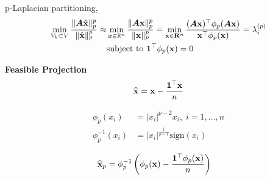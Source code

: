 \documentclass[12pt]{article}
\begin{document}
{{\begin{multicols}{2}
{\begin{minipage}{.58\columnwidth}
\begin{defblock}{ 
\centering
p-Laplacian partitioning,
}
\centering
\begin{align*}
 \min_{V_k \subset V} \frac{\|\boldsymbol{A}\hat{{\bf x}}\|_p^p}{\|\hat{{\bf x}}\|_p^p}
\approx&
  \min_{\boldsymbol{x} \in \mathbb{R}^n} \frac{\|\boldsymbol{A}{\bf x}\|_p^p}{\|{\bf x}\|_p^p} 
    = \min_{{\bf x} \in {\bf R}^n} \frac{ (\boldsymbol{A} {\bf x})^\top \phi_p (\boldsymbol{A} {\bf x}) } {{\bf x}^\top \phi_p( {\bf x})} = \lambda^{(p)}_i \\ 
 &\mbox{\rm subject to}{\ } \mathbf{1}^\top \phi_p({\bf x})  = 0
\end{align*}

\end{defblock}

\end{minipage}
\hfill
\begin{minipage}{.42\columnwidth}
\centering

\centering
\textbf{Feasible Projection}\\
\begin{equation*}
\widehat{{\bf x}} = {\bf x} - \frac{\mathbf{1}^\top{\bf x}}{n}
\end{equation*}

\vspace{+1.2cm}

\centering
\begin{align*}
\phi_p(x_i) &= |x_i|^{p-2}x_i, \; i = 1, \ldots, n \\
\phi_p^{-1}(x_i) &= |x_i|^{\frac{1}{p-1}} \text{sign}(x_i)    
\end{align*}

\centering
\vspace{-0.6cm}
\begin{align*}
\widehat{{\bf x}}_p &=  \phi_p^{-1} \left(\phi_p({\bf x}) - \frac{\mathbf{1}^\top \phi_p({\bf x})}{n} \right)
\end{align*}


\end{minipage}

\columnbreak
} %



\columnbreak
{}


\begin{figure}[H]
    \centering %


\end{figure}
\end{multicols}}}
\end{document}
